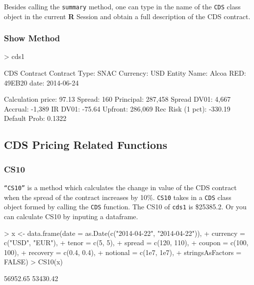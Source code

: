 \documentclass{jss}
\begin{document}
Besides calling the \texttt{summary} method, one can type in the name of the \texttt{CDS} class object in the current \textbf{R} Session and obtain a full description of the CDS contract.

\subsubsection{Show Method}
\label{sec:showMethod}

\begin{Schunk}
\begin{Sinput}
> cds1
\end{Sinput}
\begin{Soutput}
CDS Contract 
Contract Type:                      SNAC   Currency:                         USD
Entity Name:                       Alcoa   RED:                           49EB20
date:                         2014-06-24

Calculation 
price:                             97.13   Spread:                           160
Principal:                       287,458   Spread DV01:                    4,667
Accrual:                          -1,389   IR DV01:                       -75.64
Upfront:                         286,069   Rec Risk (1 pct):             -330.19
Default Prob:                     0.1322
\end{Soutput}
\end{Schunk}

\subsection{CDS Pricing Related Functions}
\label{sec:CDSpricingFunctions}

\subsubsection{CS10}
\label{sec:CS10}

\texttt{``CS10''} is a method which calculates the change in value of the CDS contract when the spread of the contract increases by 10\%. \texttt{CS10} takes in a \texttt{CDS} class object formed by calling the \texttt{CDS} function. The CS10 of \texttt{cds1} is \$25385.2. Or you can calculate CS10 by inputing a dataframe. 

\begin{Schunk}
\begin{Sinput}
> x <- data.frame(date = as.Date(c("2014-04-22", "2014-04-22")),
+                 currency = c("USD", "EUR"),
+                 tenor = c(5, 5),
+                 spread = c(120, 110),
+                 coupon = c(100, 100),
+                 recovery = c(0.4, 0.4),
+                 notional = c(1e7, 1e7),
+                 stringsAsFactors = FALSE)
> CS10(x)
\end{Sinput}
\begin{Soutput}
[1] 56952.65 53430.42
\end{Soutput}
\end{Schunk}
\end{document}
